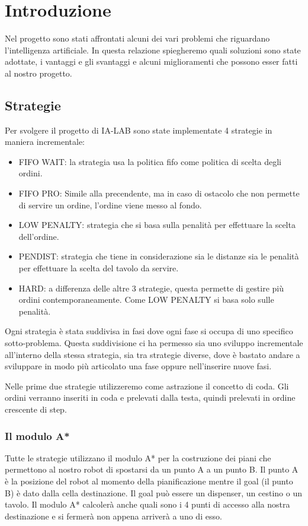 \chapter{Introduzione}
Nel progetto sono stati affrontati alcuni dei vari problemi che riguardano l'intelligenza artificiale. In questa relazione spiegheremo quali soluzioni sono state adottate, i vantaggi e gli svantaggi e alcuni miglioramenti che possono esser fatti al nostro progetto.

\section{Strategie}
Per svolgere il progetto di IA-LAB sono state implementate 4 strategie in maniera incrementale:
\begin{itemize}
  \item FIFO WAIT: la strategia usa la politica fifo come politica di scelta degli ordini.
  \item FIFO PRO: Simile alla precendente, ma in caso di ostacolo che non permette di servire un ordine, l'ordine viene messo al fondo.
  \item LOW PENALTY: strategia che si basa sulla penalità per effettuare la scelta dell'ordine.
  \item PENDIST: strategia che tiene in considerazione sia le distanze sia le penalità per effettuare la scelta del tavolo da servire.
  \item HARD: a differenza delle altre 3 strategie, questa permette di gestire più ordini contemporaneamente. Come LOW PENALTY si basa solo sulle penalità.
\end{itemize}

Ogni strategia è stata suddivisa in fasi dove ogni fase si occupa di uno specifico sotto-problema. Questa suddivisione ci ha permesso sia uno sviluppo incrementale all'interno della stessa strategia, sia tra strategie diverse, dove è bastato andare a sviluppare in modo più articolato una fase oppure nell'inserire nuove fasi.

Nelle prime due strategie utilizzeremo come astrazione il concetto di coda. Gli ordini verranno inseriti in coda e prelevati dalla testa, quindi prelevati in ordine crescente di step.

\subsection{Il modulo A*}
\label{sec:modulo_astar}
Tutte le strategie utilizzano il modulo A* per la costruzione dei piani che permettono al nostro robot di spostarsi da un punto A a un punto B. Il punto A è la posizione del robot al momento della pianificazione mentre il goal (il punto B) è dato dalla cella destinazione. Il goal può essere un dispenser, un cestino o un tavolo. Il modulo A* calcolerà anche quali sono i 4 punti di accesso alla nostra destinazione e si fermerà non appena arriverà a uno di esso.

